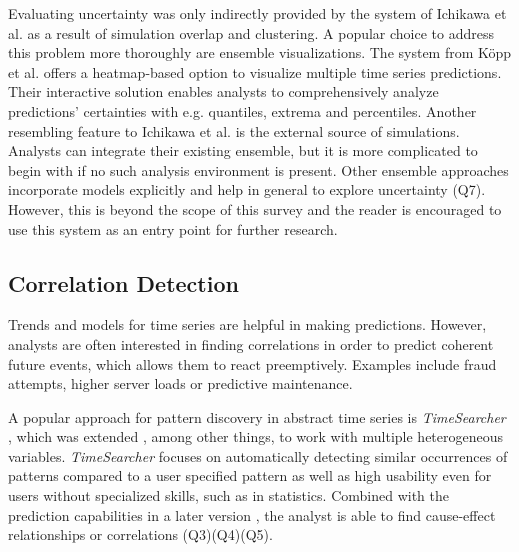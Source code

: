 \documentclass[electronic]{vgtc}             %
\begin{document}
Evaluating uncertainty was only indirectly provided by the system of Ichikawa et al. \cite{ichikawa:2002} as a result of simulation overlap and clustering.
A popular choice to address this problem more thoroughly are ensemble visualizations.
The system from K\"opp et al. \cite{koepp:2014} offers a heatmap-based option to visualize multiple time series predictions. 
Their interactive solution enables analysts to comprehensively analyze predictions' certainties with e.g. quantiles, extrema and percentiles. 
Another resembling feature to Ichikawa et al. \cite{ichikawa:2002} is the external source of simulations. 
Analysts can integrate their existing ensemble, but it is more complicated to begin with if no such analysis environment is present. 
Other ensemble approaches incorporate models explicitly and help in general to explore uncertainty (Q7).
However, this is beyond the scope of this survey and the reader is encouraged to use this system as an entry point for further research. 

\subsection{Correlation Detection\label{subsec:correlation}}
Trends and models for time series are helpful in making predictions.  
However, analysts are often interested in finding correlations in order to predict coherent future events, which allows them to react preemptively. 
Examples include fraud attempts, higher server loads or predictive maintenance.

A popular approach for pattern discovery in abstract time series is \textit{TimeSearcher} \cite{Hochheiser:2004}, which was extended \cite{buono:2005}, among other things, to work with multiple heterogeneous variables.
\textit{TimeSearcher} focuses on automatically detecting similar occurrences of patterns compared to a user specified pattern as well as high usability even for users without specialized skills, such as in statistics.
Combined with the prediction capabilities in a later version \cite{buono:2007}, the analyst is able to find cause-effect relationships or correlations (Q3)(Q4)(Q5).
\end{document}
